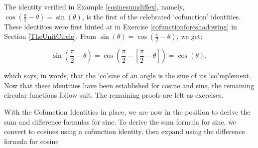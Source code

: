 \medskip


The identity verified in Example \ref{cosinesumdiffex}, namely, $\cos\left(\frac{\pi}{2} - \theta\right) = \sin(\theta)$,  is the first of the celebrated `cofunction' identities.  These identities were first hinted at in Exercise \ref{cofunctionforeshadowing} in Section \ref{TheUnitCircle}. From $ \sin(\theta) = \cos\left(\frac{\pi}{2} - \theta\right) $, we get:

\[ \sin\left(\dfrac{\pi}{2} - \theta\right) = \cos\left(\dfrac{\pi}{2} -\left[\dfrac{\pi}{2} - \theta\right]\right) = \cos(\theta),\]

which says, in words, that the `co'sine of an angle is the sine of its `co'mplement.  Now that these identities have been established for cosine and sine, the remaining circular functions follow suit.  The remaining proofs are left as exercises.

\medskip


\medskip

With the Cofunction Identities in place, we are now in the position to derive the sum and difference formulas for sine.  To derive the sum formula for sine, we convert to cosines using a cofunction identity, then expand using the difference formula for cosine

